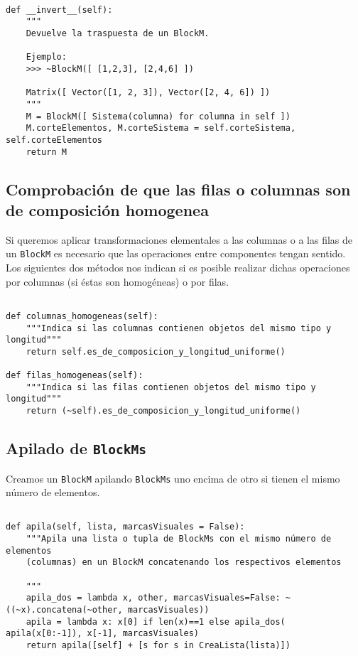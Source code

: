 \documentclass[11pt]{report}
\begin{document}
\begin{verbatim}

def __invert__(self):
    """
    Devuelve la traspuesta de un BlockM.
    
    Ejemplo:
    >>> ~BlockM([ [1,2,3], [2,4,6] ])
    
    Matrix([ Vector([1, 2, 3]), Vector([2, 4, 6]) ])
    """
    M = BlockM([ Sistema(columna) for columna in self ])
    M.corteElementos, M.corteSistema = self.corteSistema, self.corteElementos
    return M

\end{verbatim}

\subsection{Comprobación de que las filas o columnas son de composición homogenea}
\label{sec:org94ac88f}

Si queremos aplicar transformaciones elementales a las columnas o a
las filas de un \texttt{BlockM} es necesario que las operaciones entre
componentes tengan sentido. Los siguientes dos métodos nos indican si
es posible realizar dichas operaciones por columnas (si éstas son
homogéneas) o por filas.
\begin{verbatim}

def columnas_homogeneas(self):
    """Indica si las columnas contienen objetos del mismo tipo y longitud"""
    return self.es_de_composicion_y_longitud_uniforme()

def filas_homogeneas(self):
    """Indica si las filas contienen objetos del mismo tipo y longitud"""
    return (~self).es_de_composicion_y_longitud_uniforme()

\end{verbatim}

\subsection{Apilado de \texttt{BlockMs}}
\label{sec:org18a40b2}

Creamos un \texttt{BlockM} apilando \texttt{BlockMs} uno encima de otro si tienen el
mismo número de elementos.
\begin{verbatim}

def apila(self, lista, marcasVisuales = False):
    """Apila una lista o tupla de BlockMs con el mismo número de elementos
    (columnas) en un BlockM concatenando los respectivos elementos

    """
    apila_dos = lambda x, other, marcasVisuales=False: ~((~x).concatena(~other, marcasVisuales))
    apila = lambda x: x[0] if len(x)==1 else apila_dos( apila(x[0:-1]), x[-1], marcasVisuales)
    return apila([self] + [s for s in CreaLista(lista)])

\end{verbatim}
\end{document}
